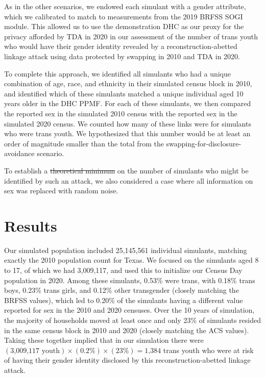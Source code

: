 \documentclass{jpc} %
\theoremstyle{plain}\newtheorem{satz}[thm]{Satz} %
\providecommand{\DIFaddtex}[1]{{\protect\color{blue}\uwave{#1}}} %
\providecommand{\DIFdeltex}[1]{{\protect\color{red}\sout{#1}}}                      %
\providecommand{\DIFaddbegin}{} %
\providecommand{\DIFaddend}{} %
\providecommand{\DIFdelbegin}{} %
\providecommand{\DIFdelend}{} %
\providecommand{\DIFadd}[1]{\texorpdfstring{\DIFaddtex{#1}}{#1}} %
\providecommand{\DIFdel}[1]{\texorpdfstring{\DIFdeltex{#1}}{}} %
\begin{document}
As in the other scenarios, we endowed each simulant with a gender attribute, which we calibrated to match to measurements from the 2019 BRFSS SOGI module. This allowed us to use the demonstration DHC as our proxy for the privacy afforded by TDA in 2020 in our assessment of the number of trans youth who would have their gender identity revealed by a reconstruction-abetted linkage attack using data protected by swapping in 2010 and TDA in 2020.

To complete this approach, we identified all simulants who had a unique combination of age, race, and ethnicity in their simulated census block in 2010, and identified which of these simulants matched a unique individual aged 10 years older in the DHC PPMF.  For each of these simulants, we then compared the reported sex in the simulated 2010 census with the reported sex in the simulated 2020 census. We counted how many of these links were for simulants who were trans youth.  We hypothesized that this number would be at least an order of magnitude smaller than the total from the swapping-for-disclosure-avoidance scenario.

To establish a \DIFdelbegin \DIFdel{theoretical minimum }\DIFdelend \DIFaddbegin \DIFadd{baseline }\DIFaddend on the number of simulants who might be identified by such an attack, we also considered a case where all information on sex was replaced with random noise.

\section*{Results}

Our simulated population included 25,145,561 individual simulants, matching exactly the 2010 population count for Texas.  We focused on the simulants aged 8 to 17, of which we had 3,009,117, and used this to initialize our Census Day population in 2020.
Among these simulants, 0.53\% were trans, with 0.18\% trans boys, 0.23\% trans girls, and 0.12\% other transgender (closely matching the BRFSS values), which led to 0.20\% of the simulants having a different value reported for sex in the 2010 and 2020 censuses.
Over the 10 years of simulation, the majority of households moved at least once and only 23\% of simulants resided in the same census block in 2010 and 2020 (closely matching the ACS values).
Taking these together implied that in our simulation there were $(\text{3,009,117} \text{ youth}) \times (0.2\%) \times (23\%) = \text{1,384}$ trans youth who were at risk of having their gender identity disclosed by this reconstruction-abetted linkage attack.
\end{document}

